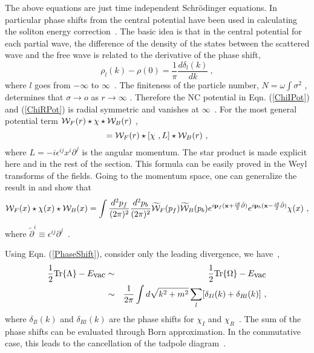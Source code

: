 \documentclass[a4paper,a4paper]{article}
\def\Tr{{\hbox{Tr}}}
\def\hvac{{\hbox{vac}}}
\def\cW{{\cal W}}
\def\bp{{\bf p}}
\def\bx{{{\bf x}}}
\def\tpartial{{\tilde{\partial}}}
\def\bpartial{{\bf \partial}}
\def\tbpartial{{\tilde{\bpartial}}}
\def\fitheta{{\frac{i\theta}2}}
\begin{document}
The above equations are just time independent Schr\"{o}dinger equations. 
In particular phase shifts from the central 
potential have been used in calculating the soliton energy correction~\cite{Graham}. 
The basic idea is that in the central potential for each partial wave, 
the difference of the density of the states between the scattered wave 
and the free wave is related to the derivative of the phase shift, 
\begin{equation}
  \rho_l(k)-\rho(0)=\frac 1\pi\frac {d\delta_l(k)}{dk}\ ,                                       \label{PhaseShift}
\end{equation}
where $l$ goes from $-\infty$ to $\infty$\ .
The finiteness of the particle number, $N=\omega\int\sigma^2$ , 
determines that $\sigma\rightarrow o$ as $r\rightarrow \infty$ . 
Therefore the NC potential in Eqn. 
(\ref{ChiIPot}) and (\ref{ChiRPot}) is radial symmetric and vanishes at 
$\infty$\ . For the most general potential term $\cW_F(r)\star\chi\star\cW_B(r)$ ,
\begin{equation}
      [\cW_F(r)\star\chi\star\cW_B(r)\ ,L]=\cW_F(r)\star[\chi\ ,L]\star\cW_B(r)\ , 
\end{equation}
where $L=-i\epsilon^{ij}x^i\partial^j$ is the angular momentum.
The star product is made explicit here and in the rest of the section. 
This formula can be easily proved in the Weyl transforms of the fields. 
Going to the momentum space, one can generalize the result in \cite{Big} and show that 
\begin{equation}
  \cW_F(x)\star\chi(x)\star\cW_B(x)=\int \frac{d^2p_f}{(2\pi)^2}\frac{d^2p_b}{(2\pi)^2}
\widetilde{\cW}_F(p_f)\widetilde{\cW}_B(p_b)
e^{i\bp_f(\bx+\fitheta\tbpartial)}e^{i\bp_b(\bx-\fitheta\tbpartial)}\chi(x)\ ,                             \label{EffW}
\end{equation}
where $\tpartial^i\equiv \epsilon^{ij}\partial^j$\ . 

Using Eqn. (\ref{PhaseShift}), consider only the leading divergence, 
we have~\cite{Sch}, 
\begin{eqnarray}
  \frac 12\Tr\{\Lambda\}-E_\hvac&\sim&\frac 12\Tr\{\Omega\}-E_\hvac\nonumber\\
&\sim&\frac 1{2\pi}\int d\sqrt{k^2+m^2}\sum_l[\delta_{Il}(k)+\delta_{Rl}(k)]\ ,                 \label{EnergyDiv}
\end{eqnarray}
where $\delta_{Il}(k)$ and $\delta_{Rl}(k)$ are the phase shifts for 
$\chi_I$ and $\chi_R$\ . 
The sum of the phase shifts can be evaluated through Born approximation. 
In the commutative case, this leads to the cancellation of the tadpole 
diagram~\cite{Graham}. 
\end{document}
